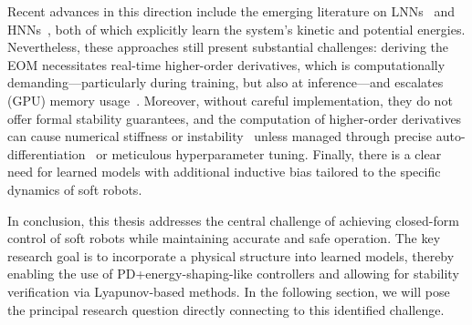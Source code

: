 Recent advances in this direction include the emerging literature on \glspl{LNN}~\citep{lutter2019deep, cranmer2020lagrangian, liu2024physics} and \glspl{HNN}~\citep{greydanus2019hamiltonian, liu2024physics}, both of which explicitly learn the system’s kinetic and potential energies. Nevertheless, these approaches still present substantial challenges: deriving the \gls{EOM} necessitates real-time higher-order derivatives, which is computationally demanding—particularly during training, but also at inference—and escalates (GPU) memory usage~\citep{lutter2019deep}. Moreover, without careful implementation, they do not offer formal stability guarantees, and the computation of higher-order derivatives can cause numerical stiffness or instability~\citep{greydanus2019hamiltonian} unless managed through precise auto-differentiation~\citep{rumelhart1986learning} or meticulous hyperparameter tuning. Finally, there is a clear need for learned models with additional inductive bias tailored to the specific dynamics of soft robots.

In conclusion, this thesis addresses the central challenge of achieving closed-form control of soft robots while maintaining accurate and safe operation. The key research goal is to incorporate a physical structure into learned models, thereby enabling the use of PD+energy-shaping-like controllers and allowing for stability verification via Lyapunov-based methods. In the following section, we will pose the principal research question directly connecting to this identified challenge.

